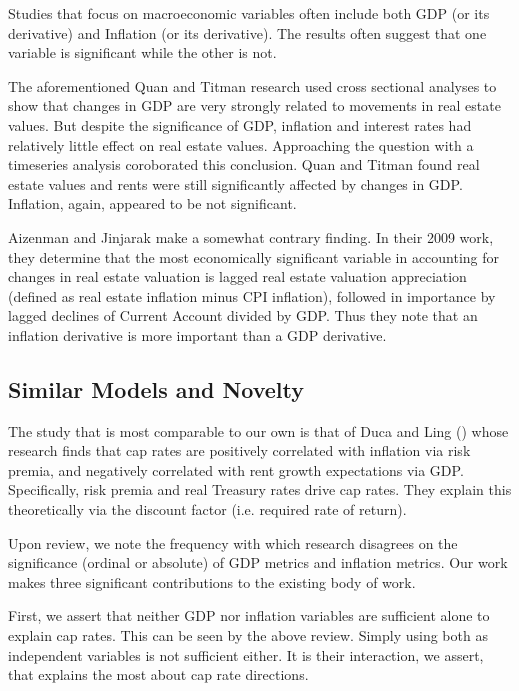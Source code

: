 Studies that focus on macroeconomic variables often include both GDP (or its derivative) and Inflation (or its derivative). The results often suggest that one variable is significant while the other is not. 

The aforementioned Quan and Titman research used cross sectional analyses to show that changes in GDP are very strongly related to movements in real estate values. But despite the significance of GDP, inflation and interest rates had relatively little effect on real estate values. Approaching the question with a timeseries analysis coroborated this conclusion. Quan and Titman found real estate values and rents were still significantly affected by changes in GDP. Inflation, again, appeared to be not significant. 

Aizenman and Jinjarak make a somewhat contrary finding. In their 2009 work, \citep*{aizenman2009current} they determine that the most economically significant variable in accounting for changes in real estate valuation is lagged real estate valuation appreciation (defined as real estate inflation minus CPI inflation), followed in importance by lagged declines of Current Account divided by GDP. Thus they note that an inflation derivative is more important than a GDP derivative. 

\subsection{Similar Models and Novelty}

The study that is most comparable to our own is that of Duca and Ling (\citeyear{duca2017taxes}) whose research finds that cap rates are positively correlated with inflation via risk premia, and negatively correlated with rent growth expectations via GDP. Specifically, risk premia and real Treasury rates drive cap rates. They explain this theoretically via the discount factor (i.e. required rate of return).

Upon review, we note the frequency with which research disagrees on the significance (ordinal or absolute) of GDP metrics and inflation metrics. Our work makes three significant contributions to the existing body of work. 

First, we assert that neither GDP nor inflation variables are sufficient alone to explain cap rates. This can be seen by the above review. Simply using both as independent variables is not sufficient either. It is their interaction, we assert, that explains the most about cap rate directions. 

